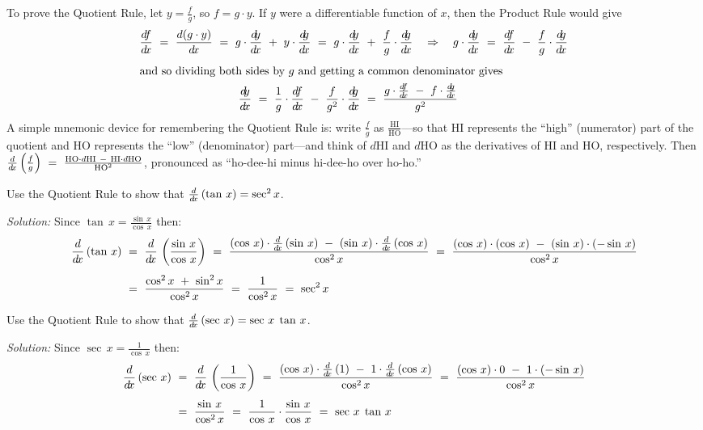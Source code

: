 To prove the Quotient Rule, let $y = \frac{f}{g}$, so $f = g \cdot y$. If $y$
were a differentiable function of $x$, then the Product Rule would give
\begin{gather*}
 \dfdx ~=~ \frac{d(g \cdot y)}{\dx} ~=~ g \cdot \dydx ~+~ y \cdot \dgdx ~=~
  g \cdot \dydx ~+~ \frac{f}{g} \cdot \dgdx \quad\Rightarrow\quad
  g \cdot \dydx ~=~ \dfdx ~-~ \frac{f}{g} \cdot \dgdx\\[4pt]
 \intertext{and so dividing both sides by $g$ and getting a common denominator gives}
 \dydx ~=~ \frac{1}{g} \cdot \dfdx ~-~ \frac{f}{g^2} \cdot \dgdx ~=~
  \dfrac{g \cdot \dfdx ~-~ f \cdot \dgdx}{g^2} \quad\checkmark
\end{gather*}
A simple mnemonic device for remembering the Quotient Rule is: write
$\frac{f}{g}$ as $\frac{\text{HI}}{\text{HO}}$---so that HI represents the
``high'' (numerator) part of the quotient and HO represents the ``low''
(denominator) part---and think of $d$HI and $d$HO as the derivatives of HI and
HO, respectively. Then $\frac{d}{d\!x}\left(\frac{f}{g}\right) ~=~
\frac{\text{HO} \cdot d\text{HI} ~-~ \text{HI} \cdot d\text{HO}}{\text{HO}^2}$,
pronounced as ``ho-dee-hi minus hi-dee-ho over ho-ho.''

\begin{exmp}\label{exmp:derivtan}
 Use the Quotient Rule to show that $\frac{d}{d\!x}\,(\tan\,x) = \sec^2 x$.\vspace{1mm}
 \par\noindent\emph{Solution:} Since $\tan\,x = \frac{\sin\,x}{\cos\,x}$ then:
 \begin{align*}
  \frac{d}{d\!x}\,(\tan\,x) ~&=~ \frac{d}{d\!x}\,\left(\frac{\sin\,x}{\cos\,x}\right) ~=~
   \frac{(\cos\,x) \cdot \frac{d}{d\!x}\,(\sin\,x) ~-~ (\sin\,x) \cdot \frac{d}{d\!x}\,(\cos\,x)}{\cos^2 x} ~=~
   \frac{(\cos\,x) \cdot (\cos\,x) ~-~ (\sin\,x) \cdot (-\sin\,x)}{\cos^2 x}\\[4pt]
   &=~ \frac{\cos^2 x ~+~ \sin^2 x}{\cos^2 x} ~=~ \frac{1}{\cos^2 x} ~=~ \sec^2 x
 \end{align*}
\end{exmp}
\begin{exmp}\label{exmp:derivsec}
 Use the Quotient Rule to show that $\frac{d}{d\!x}\,(\sec\,x) = \sec\,x \; \tan\,x$.\vspace{1mm}
 \par\noindent\emph{Solution:} Since $\sec\,x = \frac{1}{\cos\,x}$ then:
 \begin{align*}
  \frac{d}{d\!x}\,(\sec\,x) ~&=~ \frac{d}{d\!x}\,\left(\frac{1}{\cos\,x}\right) ~=~
   \frac{(\cos\,x) \cdot \frac{d}{d\!x}\,(1) ~-~ 1 \cdot \frac{d}{d\!x}\,(\cos\,x)}{\cos^2 x} ~=~
   \frac{(\cos\,x) \cdot 0 ~-~ 1 \cdot (-\sin\,x)}{\cos^2 x}\\[4pt]
   &=~ \frac{\sin\,x}{\cos^2 x} ~=~ \frac{1}{\cos\,x} \cdot \frac{\sin\,x}{\cos\,x} ~=~ \sec\,x \; \tan\,x
 \end{align*}
\end{exmp}
\divider
\vspace{2mm}

